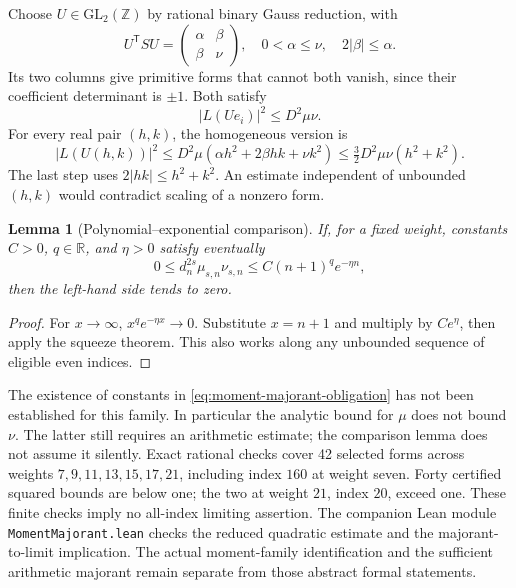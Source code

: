 \documentclass[11pt]{article}
\newtheorem{lemma}[theorem]{Lemma}
\theoremstyle{remark}
\newcommand{\Z}{\mathbb Z}
\newcommand{\R}{\mathbb R}
\begin{document}
Choose \(U\in\mathrm{GL}_2(\Z)\) by rational binary Gauss reduction,
with
\[
 U^{\mathsf T}SU=\begin{pmatrix}\alpha&\beta\\\beta&\nu\end{pmatrix},
 \quad 0<\alpha\le\nu,\quad 2|\beta|\le\alpha.
\]
Its two columns give primitive forms that cannot both vanish, since
their coefficient determinant is \(\pm1\). Both satisfy
\[
 |L(Ue_i)|^2\le D^2\mu\nu.
\]
For every real pair \((h,k)\), the homogeneous version is
\[
 |L(U(h,k))|^2\le D^2\mu(\alpha h^2+2\beta hk+\nu k^2)
 \le\tfrac32D^2\mu\nu(h^2+k^2).
\]
The last step uses \(2|hk|\le h^2+k^2\). An estimate independent
of unbounded \((h,k)\) would contradict scaling of a nonzero form.

\begin{lemma}[Polynomial--exponential comparison]
If, for a fixed weight, constants \(C>0\), \(q\in\R\), and
\(\eta>0\) satisfy eventually
\begin{equation}
 0\le d_n^{2s}\mu_{s,n}\nu_{s,n}
       \le C(n+1)^q e^{-\eta n},
 \label{eq:moment-majorant-obligation}
\end{equation}
then the left-hand side tends to zero.
\end{lemma}
\begin{proof}
For \(x\to\infty\), \(x^q e^{-\eta x}\to0\).
Substitute \(x=n+1\) and multiply by \(Ce^\eta\), then apply
the squeeze theorem. This also works along any unbounded sequence of
eligible even indices.
\end{proof}
The existence of constants in \eqref{eq:moment-majorant-obligation}
has not been established for this family. In particular the analytic
bound for \(\mu\) does not bound \(\nu\). The latter still requires
an arithmetic estimate; the comparison lemma does not assume it silently.
Exact rational checks cover 42 selected forms across weights
\(7,9,11,13,15,17,21\), including index \(160\) at weight seven.
Forty certified squared bounds are below one; the two at weight
\(21\), index \(20\), exceed one. These finite checks imply no
all-index limiting assertion.
The companion Lean module \texttt{MomentMajorant.lean} checks the reduced
quadratic estimate and the majorant-to-limit implication. The actual
moment-family identification and the sufficient arithmetic majorant
remain separate from those abstract formal statements.
\end{document}
